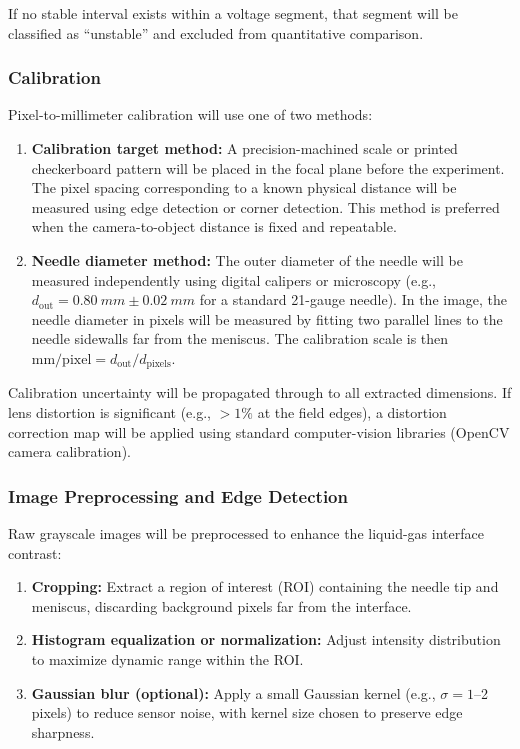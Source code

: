 If no stable interval exists within a voltage segment, that segment will be classified as ``unstable'' and excluded from quantitative comparison.

\subsubsection{Calibration}

Pixel-to-millimeter calibration will use one of two methods:
\begin{enumerate}
    \item \textbf{Calibration target method:} A precision-machined scale or printed checkerboard pattern will be placed in the focal plane before the experiment. The pixel spacing corresponding to a known physical distance will be measured using edge detection or corner detection. This method is preferred when the camera-to-object distance is fixed and repeatable.
    \item \textbf{Needle diameter method:} The outer diameter of the needle will be measured independently using digital calipers or microscopy (e.g., $d_{\mathrm{out}} = \SI{0.80}{mm} \pm \SI{0.02}{mm}$ for a standard 21-gauge needle). In the image, the needle diameter in pixels will be measured by fitting two parallel lines to the needle sidewalls far from the meniscus. The calibration scale is then $\text{mm/pixel} = d_{\mathrm{out}} / d_{\text{pixels}}$.
\end{enumerate}

Calibration uncertainty will be propagated through to all extracted dimensions. If lens distortion is significant (e.g., $>1\%$ at the field edges), a distortion correction map will be applied using standard computer-vision libraries (OpenCV camera calibration).

\subsubsection{Image Preprocessing and Edge Detection}

Raw grayscale images will be preprocessed to enhance the liquid-gas interface contrast:
\begin{enumerate}
    \item \textbf{Cropping:} Extract a region of interest (ROI) containing the needle tip and meniscus, discarding background pixels far from the interface.
    \item \textbf{Histogram equalization or normalization:} Adjust intensity distribution to maximize dynamic range within the ROI.
    \item \textbf{Gaussian blur (optional):} Apply a small Gaussian kernel (e.g., $\sigma = 1$--2 pixels) to reduce sensor noise, with kernel size chosen to preserve edge sharpness.
\end{enumerate}

